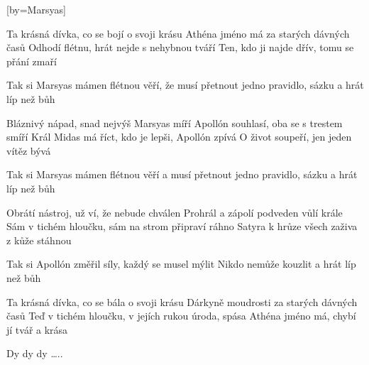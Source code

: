 [by={Marsyas}]

\beginverse{}
Ta krásná dívka, co se bojí o svoji krásu
Athéna jméno má za starých dávných časů
Odhodí flétnu, hrát nejde s nehybnou tváří
Ten, kdo ji najde dřív, tomu se přání zmaří
\endverse{}

\beginchorus{}
Tak si Marsyas mámen flétnou věří, že musí přetnout
\lrep{} jedno pravidlo, sázku a hrát líp než bůh \rrep{}
\endchorus{}

\beginverse{}
Bláznivý nápad, snad nejvýš Marsyas míří
Apollón souhlasí, oba se s trestem smíří
Král Midas má říct, kdo je lepši, Apollón zpívá
O život soupeří, jen jeden vítěz bývá
\endverse{}

\beginchorus{}
Tak si Marsyas mámen flétnou věří a musí přetnout
\lrep{} jedno pravidlo, sázku a hrát líp než bůh \rrep{}
\endchorus{}

\beginverse{}
Obrátí nástroj, už ví, že nebude chválen
Prohrál a zápolí podveden vůlí krále
Sám v tichém hloučku, sám na strom připraví ráhno
Satyra k hrůze všech zaživa z kůže stáhnou
\endverse{}

\beginchorus{}
Tak si Apollón změřil síly, každý se musel mýlit
\lrep{} Nikdo nemůže kouzlit a hrát líp než bůh \rrep{}
\endchorus{}

\beginverse{}
Ta krásná dívka, co se bála o svoji krásu
Dárkyně moudrosti za starých dávných časů
Teď v tichém hloučku, v jejích rukou úroda, spása
Athéna jméno má, chybí jí tvář a krása
\endverse{}

\beginchorus{}
Dy dy dy \ldots{}..
\endchorus{}

\endsong{}

